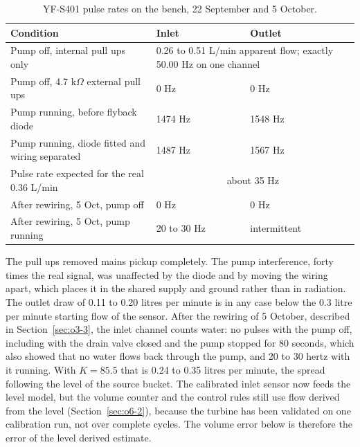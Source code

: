 \begin{table}[H]
\caption{YF-S401 pulse rates on the bench, 22 September and 5 October.}
\label{tab:flownoise}
\centering
\renewcommand{\arraystretch}{1.05}
\begin{tabular}{|p{6.4cm}|p{3.0cm}|p{3.0cm}|}
\hline
\textbf{Condition} & \textbf{Inlet} & \textbf{Outlet} \\
\hline
Pump off, internal pull ups only & \multicolumn{2}{p{6.0cm}|}{0.26 to 0.51 L/min apparent flow; exactly 50.00 Hz on one channel} \\ \hline
Pump off, 4.7 k$\Omega$ external pull ups & 0 Hz & 0 Hz \\ \hline
Pump running, before flyback diode & 1474 Hz & 1548 Hz \\ \hline
Pump running, diode fitted and wiring separated & 1487 Hz & 1567 Hz \\ \hline
Pulse rate expected for the real 0.36 L/min & \multicolumn{2}{c|}{about 35 Hz} \\ \hline
After rewiring, 5 Oct, pump off & 0 Hz & 0 Hz \\ \hline
After rewiring, 5 Oct, pump running & 20 to 30 Hz & intermittent \\ \hline
\end{tabular}
\end{table}

The pull ups removed mains pickup completely. The pump interference, forty times the real signal, was unaffected by the diode and by moving the wiring apart, which places it in the shared supply and ground rather than in radiation. The outlet draw of 0.11 to 0.20 litres per minute is in any case below the 0.3 litre per minute starting flow of the sensor. After the rewiring of 5 October, described in Section~\ref{sec:o3-3}, the inlet channel counts water: no pulses with the pump off, including with the drain valve closed and the pump stopped for 80 seconds, which also showed that no water flows back through the pump, and 20 to 30 hertz with it running. With $K = 85.5$ that is 0.24 to 0.35 litres per minute, the spread following the level of the source bucket. The calibrated inlet sensor now feeds the level model, but the volume counter and the control rules still use flow derived from the level (Section~\ref{sec:o6-2}), because the turbine has been validated on one calibration run, not over complete cycles. The volume error below is therefore the error of the level derived estimate.

